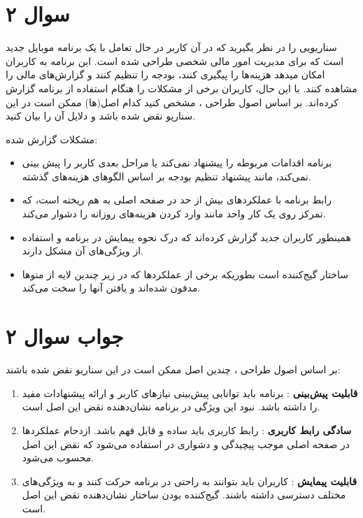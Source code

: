 \section*{سوال ۲}

سناریویی را در نظر بگیرید که در آن کاربر در حال تعامل با یک برنامه موبایل جدید است که برای مدیریت امور مالی شخصی طراحی شده است. این برنامه به کاربران امکان میدهد هزینه‌ها را پیگیری کنند، بودجه را تنظیم کنند و گزارش‌های مالی را مشاهده کنند. با این حال، کاربران برخی از مشکلات را هنگام استفاده از برنامه گزارش کرده‌اند. بر اساس اصول طراحی
 ، مشخص کنید کدام اصل(ها) ممکن است در این سناریو نقض شده باشد و دلایل آن را بیان کنید.

مشکلات گزارش شده:
\begin{itemize}
	\item برنامه اقدامات مربوطه را پیشنهاد نمی‌کند یا مراحل بعدی کاربر را پیش بینی نمی‌کند، مانند پیشنهاد تنظیم بودجه بر اساس الگوهای هزینه‌های گذشته.
	\item رابط برنامه با عملکردهای بیش از حد در صفحه اصلی به هم ریخته است، که تمرکز روی یک کار واحد مانند وارد کردن هزینه‌های روزانه را دشوار می‌کند.
	\item همینطور کاربران جدید گزارش کرده‌اند که درک نحوه پیمایش در برنامه و استفاده از ویژگی‌های آن مشکل دارند.
	\item ساختار  گیج‌کننده است بطوریکه برخی از عملکردها که در زیر چندین لایه از منوها مدفون شده‌اند و یافتن آنها را سخت می‌کند.
\end{itemize}

\section*{جواب سوال ۲}

بر اساس اصول طراحی
 ، چندین اصل ممکن است در این سناریو نقض شده باشند:

\begin{enumerate}
	\item \textbf{قابلیت پیش‌بینی }: برنامه باید توانایی پیش‌بینی نیازهای کاربر و ارائه پیشنهادات مفید را داشته باشد. نبود این ویژگی در برنامه نشان‌دهنده نقض این اصل است.
	
	\item \textbf{سادگی رابط کاربری }: رابط کاربری باید ساده و قابل فهم باشد. ازدحام عملکردها در صفحه اصلی موجب پیچیدگی و دشواری در استفاده می‌شود که نقض این اصل محسوب می‌شود.
	
	\item \textbf{قابلیت پیمایش }: کاربران باید بتوانند به راحتی در برنامه حرکت کنند و به ویژگی‌های مختلف دسترسی داشته باشند. گیج‌کننده بودن ساختار 
	نشان‌دهنده نقض این اصل است.
\end{enumerate}